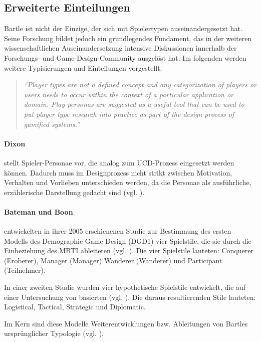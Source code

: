 \subsection{Erweiterte Einteilungen}
Bartle ist nicht der Einzige, der sich mit Spielertypen auseinandergesetzt hat. Seine Forschung bildet jedoch ein grundlegendes Fundament, das in der weiteren wissenschaftlichen Auseinandersetzung intensive Diskussionen innerhalb der Forschungs- und Game-Design-Community ausgelöst hat. Im folgenden werden weitere Typisierungen und Einteilungen vorgestellt.
\begin{quote}
    \textit{
        \enquote{Player types are not a defined concept and any categorization of players or users needs to occur within the context of a particular application or domain. Play-personas are suggested as a useful tool that can be used to put player type research into practice as part of the design process of gamified systems.}
    } 
    \cite{dixon_player_nodate}
\end{quote}

\paragraph{Dixon} 
stellt Spieler-Personae vor, die analog zum \ac{UCD}-Prozess eingesetzt werden können. Dadurch muss im Designprozess nicht strikt zwischen Motivation, Verhalten und Vorlieben unterschieden werden, da die Personae als ausführliche, erzählerische Darstellung gedacht sind (vgl. \citealp{dixon_player_nodate}).

\paragraph{Bateman und Boon}
entwickelten in ihrer 2005 erschienenen Studie zur Bestimmung des ersten Modells des Demographic Game Design (DGD1) vier Spielstile, die sie durch die Einbeziehung des \ac{MBTI} ableiteten (vgl. \citealp{noauthor_mbti_nodate, bateman_21st_2005}).
Die vier Spielstile lauteten: Conquerer (Eroberer), Manager (Manager) Wanderer (Wanderer) und Participant (Teilnehmer).

In einer zweiten Studie wurden vier hypothetische Spielstile entwickelt, die auf einer Untersuchung von \cite{berens_understanding_2000} basierten (vgl. \citealp{bateman_player_2012}). Die daraus resultierenden Stile lauteten: Logistical, Tactical, Strategic und Diplomatic.

Im Kern sind diese Modelle Weiterentwicklungen bzw. Ableitungen von Bartles ursprünglicher Typologie (vgl. \citealp{institut_fur_ludologie_spielertypen_nodate}).


